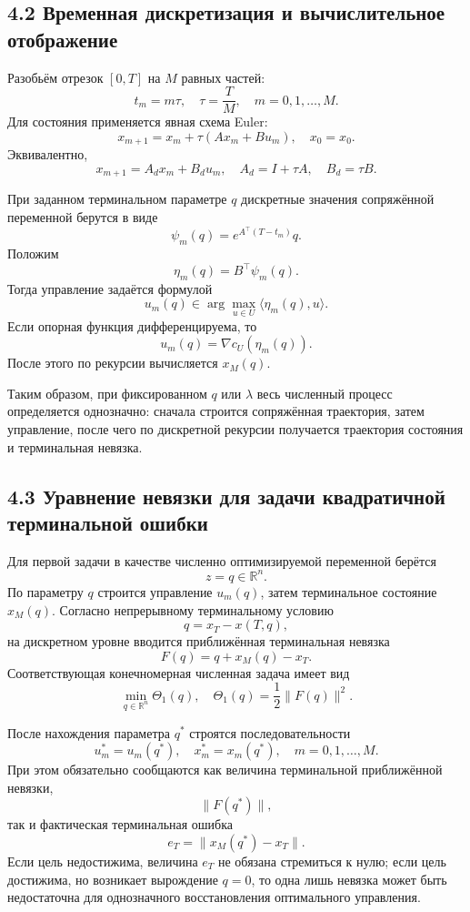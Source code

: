 \documentclass[a4paper,12pt]{article}
\begin{document}
\subsection{4.2 Временная дискретизация и вычислительное отображение}

Разобьём отрезок $[0,T]$ на $M$ равных частей:
\[
t_m=m\tau,\quad \tau=\frac{T}{M},\quad m=0,1,\ldots,M.
\]
Для состояния применяется явная схема Euler:
\[
x_{m+1}=x_m+\tau(Ax_m+Bu_m),\quad x_0=x_0.
\]
Эквивалентно,
\[
x_{m+1}=A_dx_m+B_du_m,\quad A_d=I+\tau A,\quad B_d=\tau B.
\]

При заданном терминальном параметре $q$ дискретные значения сопряжённой переменной берутся в виде
\[
\psi_m(q)=e^{A^\top(T-t_m)}q.
\]
Положим
\[
\eta_m(q)=B^\top\psi_m(q).
\]
Тогда управление задаётся формулой
\[
u_m(q)\in\arg\max_{u\in U}\langle \eta_m(q),u\rangle.
\]
Если опорная функция дифференцируема, то
\[
u_m(q)=\nabla c_U(\eta_m(q)).
\]
После этого по рекурсии вычисляется $x_M(q)$.

Таким образом, при фиксированном $q$ или $\lambda$ весь численный процесс определяется однозначно: сначала строится сопряжённая траектория, затем управление, после чего по дискретной рекурсии получается траектория состояния и терминальная невязка.

\subsection{4.3 Уравнение невязки для задачи квадратичной терминальной ошибки}

Для первой задачи в качестве численно оптимизируемой переменной берётся
\[
z=q\in\mathbb{R}^n.
\]
По параметру $q$ строится управление $u_m(q)$, затем терминальное состояние $x_M(q)$. Согласно непрерывному терминальному условию
\[
q=x_T-x(T,q),
\]
на дискретном уровне вводится приближённая терминальная невязка
\[
F(q)=q+x_M(q)-x_T.
\]
Соответствующая конечномерная численная задача имеет вид
\[
\min_{q\in\mathbb{R}^n}\Theta_1(q),\quad
\Theta_1(q)=\frac{1}{2}\|F(q)\|^2.
\]

После нахождения параметра $q^*$ строятся последовательности
\[
u_m^*=u_m(q^*),\quad x_m^*=x_m(q^*),\quad m=0,1,\ldots,M.
\]
При этом обязательно сообщаются как величина терминальной приближённой невязки,
\[
\|F(q^*)\|,
\]
так и фактическая терминальная ошибка
\[
e_T=\|x_M(q^*)-x_T\|.
\]
Если цель недостижима, величина $e_T$ не обязана стремиться к нулю; если цель достижима, но возникает вырождение $q=0$, то одна лишь невязка может быть недостаточна для однозначного восстановления оптимального управления.
\end{document}
